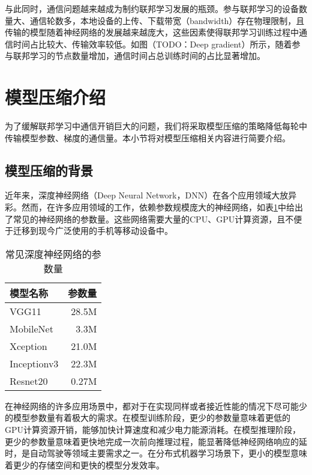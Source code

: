 与此同时，通信问题越来越成为制约联邦学习发展的瓶颈。参与联邦学习的设备数量大、通信轮数多，本地设备的上传、下载带宽（bandwidth）存在物理限制，且传输的模型随着神经网络的发展越来越庞大，这些因素使得联邦学习训练过程中通信时间占比较大、传输效率较低\cite{lin2017deep}。如图（TODO：Deep gradient）所示，随着参与联邦学习的节点数量增加，通信时间占总训练时间的占比显著增加。


\section{模型压缩介绍}

为了缓解联邦学习中通信开销巨大的问题，我们将采取模型压缩的策略降低每轮中传输模型参数、梯度的通信量。本小节将对模型压缩相关内容进行简要介绍。

\subsection{模型压缩的背景}

近年来，深度神经网络（Deep Neural Network，DNN）在各个应用领域大放异彩。然而，在许多应用领域的工作，依赖参数规模庞大的神经网络，如表\ref{tab:dnn_param}中给出了常见的神经网络的参数量。这些网络需要大量的CPU、GPU计算资源，且不便于迁移到现今广泛使用的手机等移动设备中。

\begin{table}[!hpt]
  \caption{常见深度神经网络的参数量}
  \label{tab:dnn_param}
  \centering
  \begin{tabular}{@{}lr@{}} \toprule
    模型名称  & 参数量 \\ \midrule
    VGG11\cite{simonyan2014very}  & 28.5M \\
    MobileNet\cite{howard2017mobilenets}     & 3.3M \\
    Xception\cite{chollet2017xception}    & 21.0M \\
    Inceptionv3\cite{szegedy2016rethinking} & 22.3M \\ 
    Resnet20\cite{he2016deep} & 0.27M\\
    \bottomrule
  \end{tabular}
\end{table}

在神经网络的许多应用场景中，都对于在实现同样或者接近性能的情况下尽可能少的模型参数量有着极大的需求。在模型训练阶段，更少的参数量意味着更低的GPU计算资源开销，能够加快计算速度和减少电力能源消耗。在模型推理阶段，更少的参数量意味着更快地完成一次前向推理过程，能显著降低神经网络响应的延时，是自动驾驶等领域主要需求之一。在分布式机器学习场景下，更小的模型意味着更少的存储空间和更快的模型分发效率。

